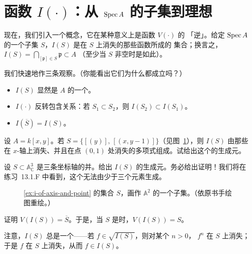 
\section{函数 $I(\cdot)$：从 $\operatorname{Spec} A$ 的子集到理想}

现在，我们引入一个概念，它在某种意义上是\trVanishingSet{}函数 $V(\cdot)$ 的
「逆」。给定 $\operatorname{Spec} A$ 的一个子集 $S$，$I(S)$ 是在 $S$ 上消失的那些函数所成的
集合；换言之，$I(S)=\bigcap_{[\mathfrak{p}]\in S}\mathfrak{p}\subset A$
（至少当 $S$ 非空时是如此）。

我们快速地作三条观察。（你能看出它们为什么都成立吗？）
\begin{itemize}
\item $I(S)$ 显然是 $A$ 的一个\trIdeal。
\item $I(\cdot)$ 反转包含关系：若 $S_1\subset S_2$，则 $I(S_2)\subset I(S_1)$。
\item $I(\overline{S})=I(S)$。
\end{itemize}

\begin{exercise}\label{ex:i-of-axis-and-point}
设 $A=k[x,y]$。若 $S=\{[(y)],\,[(x,y-1)]\}$（见图~\ref{fig:set-of-37a}），则
$I(S)$ 由那些在 $x$-轴上消失、并且在点 $(0,1)$ 处消失的多项式组成。试给出这个\trIdeal{}的生成元。
\end{exercise}

\begin{exercise}\label{ex:i-of-three-axes}
设 $S\subset\mathbb{A}^3_{\mathbb{C}}$ 是三条坐标轴的并。给出\trIdeal{} $I(S)$ 的生成元。务必给出证明！我们将在练习~13.1.F 中看到，这个\trIdeal{}无法由少于三个元素生成。
\end{exercise}

\begin{figure}[htbp]
\centering
{}
\caption{\cref{ex:i-of-axis-and-point} 的集合 $S$，画作 $\mathbb{A}^2$ 的一个子集。（依原书手绘图重绘。）}\label{fig:set-of-37a}
\end{figure}

\begin{exercise}\label{ex:v-of-i-is-closure}
证明 $V(I(S))=\overline{S}$。于是，当 $S$ 是\trClosedSet{}时，$V(I(S))=S$。
\end{exercise}

注意，$I(S)$ 总是一个\trRadicalIdeal——若 $f\in\sqrt{I(S)}$，则对某个 $n>0$，
$f^n$ 在 $S$ 上消失；于是 $f$ 在 $S$ 上消失，从而 $f\in I(S)$。

